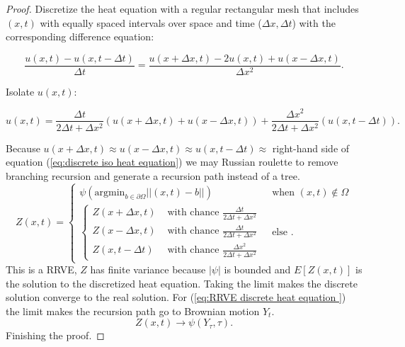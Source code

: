 \documentclass[a4paper,12pt]{article}
\begin{document}
\begin{proof} \label{proof: BM HE }
    Discretize the heat equation
    with a regular rectangular mesh that includes $(x,t)$ with equally
    spaced intervals over space and time ($\Delta x, \Delta t$) with
    the corresponding difference equation:

    \begin{equation}
        \frac{u(x,t)-u(x,t-\Delta t)}{\Delta t} = \frac{u(x + \Delta x,t)-2 u(x,t) +u(x - \Delta x,t)}{\Delta x^{2}} .
    \end{equation}

    Isolate $u(x,t)$:

    \begin{equation} \label{eq:discrete iso heat equation}
        u(x,t) =
        \frac{\Delta t}{ 2 \Delta t + \Delta x^{2}}
        \left(
        u(x+\Delta x,t)+u(x-\Delta x,t)
        \right) +
        \frac{\Delta x^{2}}{ 2 \Delta t + \Delta x^{2}}
        \left(
        u(x,t-\Delta t)
        \right).
    \end{equation}

    Because $u(x+\Delta x,t) \approx u(x-\Delta x,t) \approx u(x,t-\Delta t) \approx$
    right-hand side of equation (\ref{eq:discrete iso heat equation}) we may Russian roulette
    to remove branching recursion and generate a recursion path instead of a tree.
    \begin{equation} \label{eq:RRVE discrete heat equation }
        Z(x,t) =
        \begin{cases}
            \psi(\text{argmin}_{b \in \partial \Omega} ||(x,t) - b||)
             & \text{ when } (x,t) \notin \Omega \\
            \begin{cases}
                Z(x+\Delta x , t)  & \text{ with chance  } \frac{\Delta t}{ 2 \Delta t + \Delta x^{2}}     \\
                Z(x-\Delta x , t)  & \text{ with chance  } \frac{\Delta t}{ 2 \Delta t + \Delta x^{2}}     \\
                Z(x, t - \Delta t) & \text{ with chance  } \frac{\Delta x^{2}}{ 2 \Delta t + \Delta x^{2}}
            \end{cases}
             & \text{ else }.
        \end{cases}
    \end{equation}
    This is a RRVE, $Z$ has finite variance because $ |\psi|$ is bounded
    and $E[Z(x,t)]$ is the solution to the discretized heat equation. Taking the limit
    makes the discrete solution converge to the real solution.
    For (\ref{eq:RRVE discrete heat equation }) the limit
    makes the recursion path go to Brownian motion $Y_{t}$.
    \begin{equation}
        Z(x,t) \rightarrow \psi(Y_{\tau},\tau)  .
    \end{equation}
    Finishing the proof.
\end{proof}
\end{document}
